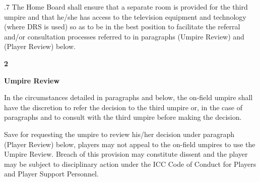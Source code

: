 \documentclass[12pt]{article}
\begin{document}

\par 

\vspace{\baselineskip}
\begin{adjustwidth}{0.5in}{0.24in}
{\fontsize{9pt}{10.8pt}.7 \tabto{0.49in} The Home Board shall ensure that a separate room is provided for the third umpire and that he/she has access to the television equipment and technology (where DRS is used) so as to be in the best position to facilitate the referral and/or consultation processes referred to in paragraphs (Umpire Review) and  (Player Review) below.\par}\par

\end{adjustwidth}


\vspace{\baselineskip}
{\fontsize{16pt}{19.2pt}\selectfont \textbf{2 \tabto{0.29in} }{\fontsize{15pt}{18.0pt}\selectfont \textbf{Umpire Review}\par}\par}\par


\vspace{\baselineskip}
\begin{adjustwidth}{0.49in}{0.19in}
\begin{justify}
{\fontsize{9pt}{10.8pt}\selectfont In the circumstances detailed in paragraphs and below, the on-field umpire shall have the discretion to refer the decision to the third umpire or, in the case of paragraphs and to consult with the third umpire before making the decision.\par}
\end{justify}\par

\end{adjustwidth}


\vspace{\baselineskip}
\begin{adjustwidth}{0.49in}{0.12in}
{\fontsize{9pt}{10.8pt}\selectfont Save for requesting the umpire to review his/her decision under paragraph (Player Review) below, players may not appeal to the on-field umpires to use the Umpire Review. Breach of this provision may constitute dissent and the player may be subject to disciplinary action under the ICC Code of Conduct for Players and Player Support Personnel.\par}\par

\end{adjustwidth}
\end{document}
